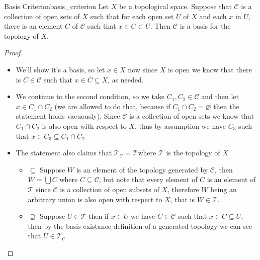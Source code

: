 \begin{lemma}
{Basis Criterion}{basis_criterion}
Let \(X\) be a topological space. Suppose that \(\mathcal{C}\) is a collection
of open sets of \(X\) such that for each open set \(U\) of \(X\) and each \(x\)
in \(U\), there is an element \(C\) of \(\mathcal{C}\) such that \(x \in C
\subset U\). Then \(\mathcal{C}\) is a basis for the topology of \(X\).
\end{lemma}
\begin{proof}
    \begin{itemize}
        \item We'll show it's a basis, so let \(x \in X \) now since \(X \)
        is open we know that there is \(C \in \mathcal{C} \) such that
        \(x \in C \subseteq X \), as needed.
        \item We continue to the second condition, so we take \(C _{1}, C _{
        2} \in \mathcal{C} \) and then let \(x \in C _{1} \cap C _{2}
        \) (we are allowed to do that, because if \(C _{1} \cap C _{2} =
        \varnothing \) then the statement holds vacuously). Since \(\mathcal{C
} \) is a collection of open sets we know that \(C _{1} \cap C _{
        2} \) is also open with respect to \(X \), thus by assumption we have \(C
        _{3} \) such that \(x \in C _{3} \subseteq C _{1} \cap C _{2} \)
        \item The statement also claims that \(\mathcal{T} _{\mathcal{C}
} = \mathcal{T} \)where \(\mathcal{T} \) is the topology of \(X \)
        \begin{itemize}
            \item \(\subseteq \) Suppose \(W \) is an element of the topology
            generated by \(\mathcal{C} \), then \(W = \bigcup C \) where \(C
            \subseteq \mathcal{C} \), but note that every element of \(C \)
            is an element of \(\mathcal{T} \) since \(\mathcal{C} \)
            is a collection of open subsets of \(X \), therefore \(W \) being
            an arbitrary union is also open with respect to \(X \), that is \(
            W \in \mathcal{T} \).
            \item \(\supseteq \) Suppose \(U \in \mathcal{T} \) then if
            \(x \in U \) we have \(C \in \mathcal{C} \) such that \(x
            \in C \subseteq U\), then by the basis existance definition of a
            generated topology we can see that \(U \in \mathcal{T} _{\mathcal{
            C}} \)
        \end{itemize}
    \end{itemize}
\end{proof}

